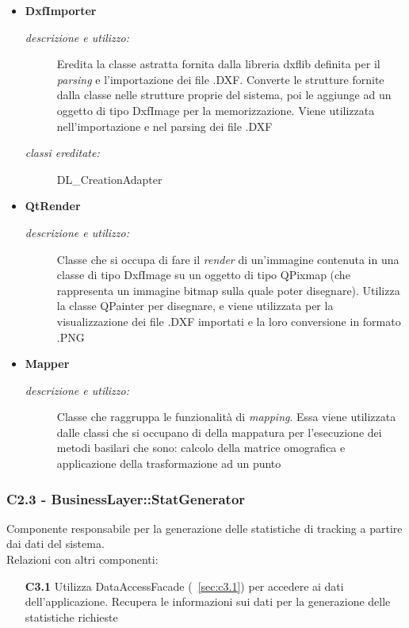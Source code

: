 \begin{itemize}
\begin{description}
\end{description}
\item \textbf{DxfImporter}
\begin{description}
\item [\textit{descrizione e utilizzo:}] Eredita la classe astratta fornita dalla libreria dxflib definita per il \textit{parsing} e l'importazione dei file .DXF. Converte le strutture fornite dalla classe nelle strutture proprie del sistema, poi le aggiunge ad un oggetto di tipo DxfImage per la memorizzazione. Viene utilizzata nell'importazione e nel parsing dei file .DXF
\item [\textit{classi ereditate:}] DL_CreationAdapter
\end{description}
\item \textbf{QtRender}
\begin{description}
\item [\textit{descrizione e utilizzo:}] Classe che si occupa di fare il \textit{render} di un'immagine contenuta in una classe di tipo DxfImage su un oggetto di tipo QPixmap (che rappresenta un immagine bitmap sulla quale poter disegnare). Utilizza la classe QPainter per disegnare, e viene utilizzata per la visualizzazione dei file .DXF importati e la loro conversione in formato .PNG
\end{description}
\item \textbf{Mapper}
\begin{description}
\item [\textit{descrizione e utilizzo:}] Classe che raggruppa le funzionalità di \textit{mapping}. Essa viene utilizzata dalle classi che si occupano di della mappatura per l'esecuzione dei metodi basilari che  sono: calcolo della matrice omografica e applicazione della trasformazione ad un punto
\end{description}
\end{itemize}

\subsubsection{C2.3 - BusinessLayer::StatGenerator} \label{sec:c2.3}
Componente responsabile per la generazione delle statistiche di tracking a partire dai dati del sistema. \\
Relazioni con altri componenti: 
\begin{itemize} 
\item [\textbf{C3.1}]
Utilizza DataAccessFacade (~\ref{sec:c3.1}) per accedere ai dati dell'applicazione. Recupera le informazioni sui dati per la generazione delle statistiche richieste 
\end{itemize} 

